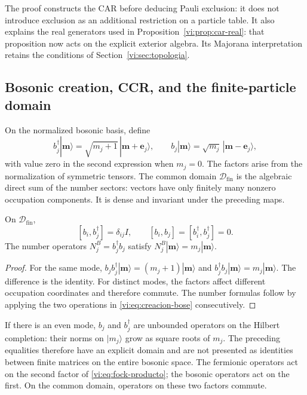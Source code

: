 The proof constructs the CAR before deducing Pauli exclusion: it does
not introduce exclusion as an additional restriction on a particle table.
It also explains the real generators used in
Proposition~\ref{vi:prop:car-real}: that proposition now acts on
the explicit exterior algebra. Its Majorana interpretation retains
the conditions of Section~\ref{vi:sec:topologia}.

\subsection{Bosonic creation, CCR, and the finite-particle domain}
\label{vi:subsec:ccr-construccion}

On the normalized bosonic basis, define
\begin{equation}
 b_j^\dagger|\boldsymbol m\rangle=
 \sqrt{m_j+1}\,|\boldsymbol m+\boldsymbol e_j\rangle,
 \qquad
 b_j|\boldsymbol m\rangle=
 \sqrt{m_j}\,|\boldsymbol m-\boldsymbol e_j\rangle,
 \label{vi:eq:creacion-bose}
\end{equation}
with value zero in the second expression when \(m_j=0\).
The factors arise from the normalization of symmetric tensors.
The common domain \(\mathcal D_{\mathrm{fin}}\) is the algebraic
direct sum of the number sectors: vectors have only finitely many
nonzero occupation components. It is dense and invariant under
the preceding maps.

\begin{theorem}
\label{vi:thm:ccr-construidas}
On \(\mathcal D_{\mathrm{fin}}\),
\[
 [b_i,b_j^\dagger]=\delta_{ij}I,\qquad
 [b_i,b_j]=[b_i^\dagger,b_j^\dagger]=0.
\]
The number operators \(N_j^B=b_j^\dagger b_j\) satisfy
\(N_j^B|\boldsymbol m\rangle=m_j|\boldsymbol m\rangle\).
\end{theorem}
\begin{proof}
For the same mode,
\(b_jb_j^\dagger|\boldsymbol m\rangle=(m_j+1)|\boldsymbol m\rangle\)
and \(b_j^\dagger b_j|\boldsymbol m\rangle=m_j|\boldsymbol m\rangle\).
The difference is the identity. For distinct modes, the factors affect
different occupation coordinates and therefore commute.
The number formulas follow by applying the two operations in
\eqref{vi:eq:creacion-bose} consecutively.
\end{proof}

If there is an even mode, \(b_j\) and \(b_j^\dagger\) are unbounded
operators on the Hilbert completion: their norms on
\(|m_j\rangle\) grow as square roots of \(m_j\).
The preceding equalities therefore have an explicit domain and are
not presented as identities between finite matrices on the entire
bosonic space. The fermionic operators act on the second factor of
\eqref{vi:eq:fock-producto}; the bosonic operators act on the first.
On the common domain, operators on these two factors commute.

